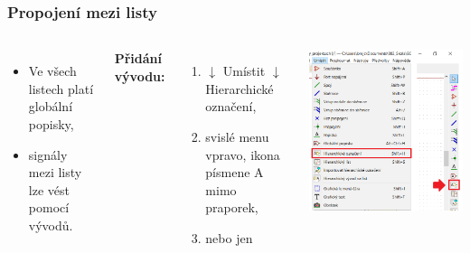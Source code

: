 \documentclass{beamer}
\begin{document}
\begin{frame}
	\frametitle{Propojení mezi listy}
	\begin{columns}
	
		\small
		
		\begin{itemize}
			\item Ve všech listech platí globální popisky,
			\item signály mezi listy lze vést pomocí vývodů.
		\end{itemize}
		
		\textbf{Přidání vývodu:}
		\begin{enumerate}
			\item $\downarrow$ Umístit $\downarrow$ Hierarchické označení,
			\item svislé menu vpravo, ikona písmene A mimo praporek,
			\item {} nebo jen 
		\end{enumerate}
		
		\begin{center}
			\includegraphics[width=\textwidth]{obr/dalsi_strana05.png}
		\end{center}
		
	\end{columns}
\end{frame}
\end{document}
